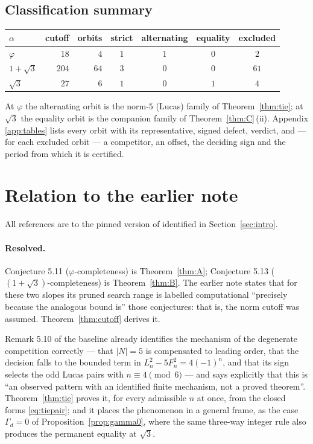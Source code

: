 \documentclass[11pt]{article}
\theoremstyle{definition}
\theoremstyle{remark}
\newcommand{\gam}{\Gamma}
\begin{document}
\subsection{Classification summary}\label{sec:summary}

\begin{center}
\begin{tabular}{lrrcccc}
\toprule
$\alpha$ & cutoff & orbits & strict & alternating & equality & excluded \\
\midrule
$\varphi$     & $18$  & $4$  & $1$ & $1$ & $0$ & $2$ \\
$1+\sqrt3$    & $204$ & $64$ & $3$ & $0$ & $0$ & $61$ \\
$\sqrt3$      & $27$  & $6$  & $1$ & $0$ & $1$ & $4$ \\
\bottomrule
\end{tabular}
\end{center}

At $\varphi$ the alternating orbit is the norm-$5$ (Lucas) family of Theorem~\ref{thm:tie}; at
$\sqrt3$ the equality orbit is the companion family of Theorem~\ref{thm:C}\,(ii). Appendix
\ref{app:tables} lists every orbit with its representative, signed defect, verdict, and --- for
each excluded orbit --- a competitor, an offset, the deciding sign and the period from which it
is certified.

\section{Relation to the earlier note}\label{sec:earlier}

All references are to the pinned version of \cite{DeJesus2026} identified in
Section~\ref{sec:intro}.

\paragraph{Resolved.}
Conjecture 5.11 ($\varphi$-completeness) is Theorem~\ref{thm:A}; Conjecture 5.13
($(1+\sqrt3)$-completeness) is Theorem~\ref{thm:B}. The earlier note states that for these two
slopes its pruned search range is labelled computational ``precisely because the analogous bound
is'' those conjectures: that is, the norm cutoff was assumed. Theorem~\ref{thm:cutoff} derives
it.

Remark 5.10 of the baseline already identifies the mechanism of the degenerate competition
correctly --- that $|N|=5$ is compensated to leading order, that the decision falls to the
bounded term in $L_n^2-5F_n^2=4(-1)^n$, and that its sign selects the odd Lucas pairs with
$n\equiv4\pmod6$ --- and says explicitly that this is ``an observed pattern with an identified
finite mechanism, not a proved theorem''. Theorem~\ref{thm:tie} proves it, for every admissible
$n$ at once, from the closed forms \eqref{eq:tiepair}; and it places the phenomenon in a general
frame, as the case $\gam_d=0$ of Proposition~\ref{prop:gamma0}, where the same three-way integer
rule also produces the permanent equality at $\sqrt3$.
\end{document}

